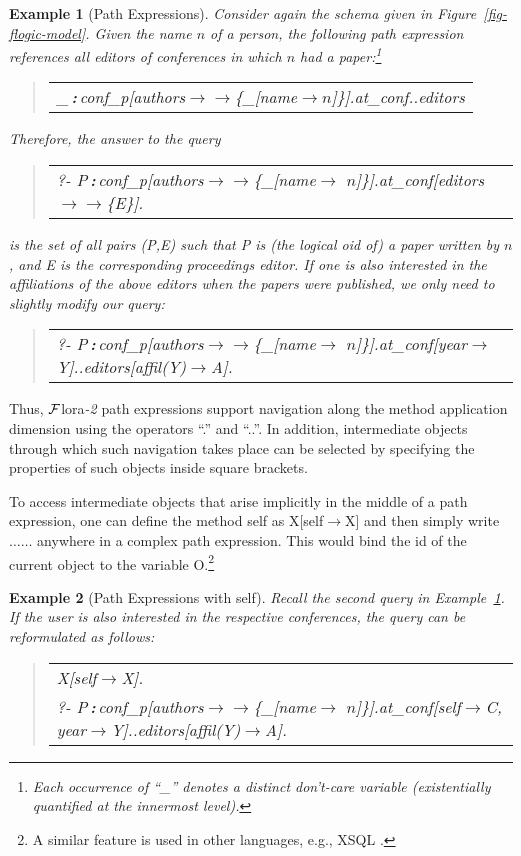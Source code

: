 \documentclass[11pt]{article}
\newtheorem{example}{Example}[section]
\newenvironment{qrules}{\begin{quote}\sf\begin{tabular}[t]{l}}%
{\end{tabular}\end{quote}}
\newcommand{\isa}{\,{\bf{:}}\,}
\newcommand{\fd}{\ensuremath{{\rightarrow}}}                   %
\newcommand{\mvd}{\ensuremath{{\rightarrow\!\!\!\!\rightarrow}}}  %
\newcommand{\anon}{\_}
\newcommand{\FLORA}{{\mbox{${\cal F}${\sc lora}\rm\emph{-2}}}\xspace}
\begin{document}
\begin{example}[Path Expressions]\label{Ex:PathExpr}
  \rm
  Consider again the schema given in Figure~\ref{fig-flogic-model}.
  Given the name $n$ of a person, the following path expression
  references all editors of conferences in which $n$ had a
  paper:\footnote{Each occurrence of ``\_'' denotes a distinct
    don't-care variable (existentially quantified at the
    innermost level).}
\begin{qrules}
  \anon\isa conf\_p[authors\mvd\{\anon [name\fd $n$]\}].at\_conf..editors
\end{qrules}
Therefore, the answer to the \emph{query}
\begin{qrules}
  ?- P\isa conf\_p[authors\mvd\{\anon [name\fd
  $n$]\}].at\_conf[editors\mvd\{E\}].
\end{qrules}
is the set of all pairs (\textsf{P},\textsf{E}) such that \textsf{P}
is (the logical oid of) a paper written by $n$, and \textsf{E} is the
corresponding proceedings editor.  If one is also interested in the
affiliations of the above editors when the papers were published, we only
need to slightly modify our query:
\begin{qrules}
  ?- P\isa conf\_p[authors\mvd\{\anon [name\fd
  $n$]\}].at\_conf[year\fd Y]..editors[affil(Y)\fd A].
\end{qrules}
\end{example}
Thus, \FLORA path expressions support navigation 
along the method application dimension using the operators
``.''  and
``..''. In addition, intermediate objects through which such navigation
takes place can be selected by specifying the properties of such objects
inside square brackets.

To access intermediate objects that arise implicitly in the middle
of a path expression, one can define the method \textsf{self} as
{\sf X[self{\fd}X]} and then simply
write $\dots${\sf [self{\fd}O]}$\dots$ anywhere in a complex
path expression. This would bind the id of the current object to the
variable {\sf O}.\footnote{
  A similar feature is used in other
  languages, e.g., XSQL \cite{xsql-92}.
  }

\begin{example}[Path Expressions with \textsf{self}]\label{ex-path-self}
  \rm
  Recall the second query in Example~\ref{Ex:PathExpr}. If the user is
  also interested in the respective conferences, the query can be
  reformulated as follows:
\begin{qrules}
  X[self\fd X].\\
   ?- P\isa conf\_p[authors\mvd\{\anon [name\fd
   $n$]\}].at\_conf[self\fd C, year\fd Y]..editors[affil(Y)\fd A]. 
\end{qrules}
\end{example}
\end{document}

